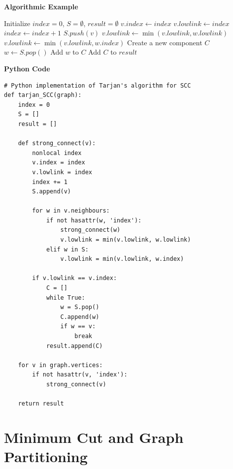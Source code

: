 \documentclass[12pt]{book} %
\begin{document}
\textbf{Algorithmic Example}
\FloatBarrier
\begin{algorithm}
\caption{Tarjan's Strongly Connected Components Algorithm}\label{tarjan}
\begin{algorithmic}[1]
\State Initialize $index=0$, $S=\emptyset$, $result=\emptyset$
    \State $v.index \gets index$
    \State $v.lowlink \gets index$
    \State $index \gets index + 1$
    \State $S.push(v)$
            \State {}
            \State $v.lowlink \gets \min(v.lowlink, w.lowlink)$
            \State $v.lowlink \gets \min(v.lowlink, w.index)$
        \EndIf
    \EndFor
        \State Create a new component $C$
        \Repeat
            \State $w \gets S.pop()$
            \State Add $w$ to $C$
        \State Add $C$ to $result$
    \EndIf
\EndFunction
\end{algorithmic}
\end{algorithm}
\FloatBarrier
\textbf{Python Code}
\FloatBarrier
\begin{lstlisting}
# Python implementation of Tarjan's algorithm for SCC
def tarjan_SCC(graph):
    index = 0
    S = []
    result = []
    
    def strong_connect(v):
        nonlocal index
        v.index = index
        v.lowlink = index
        index += 1
        S.append(v)
        
        for w in v.neighbours:
            if not hasattr(w, 'index'):
                strong_connect(w)
                v.lowlink = min(v.lowlink, w.lowlink)
            elif w in S:
                v.lowlink = min(v.lowlink, w.index)
        
        if v.lowlink == v.index:
            C = []
            while True:
                w = S.pop()
                C.append(w)
                if w == v:
                    break
            result.append(C)
    
    for v in graph.vertices:
        if not hasattr(v, 'index'):
            strong_connect(v)
    
    return result
\end{lstlisting}
\FloatBarrier

\section{Minimum Cut and Graph Partitioning}
\end{document}
